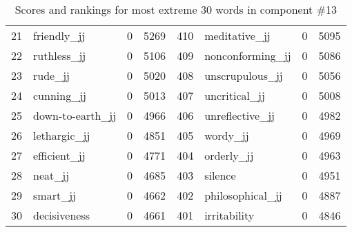 \begin{table}[tbp]
\begin{tabular}{| rlr@{.}l | rlr@{.}l |}
    21 & friendly\_jj & 0 & 5269    &    410 & meditative\_jj & 0 & 5095 \\
    22 & ruthless\_jj & 0 & 5106    &    409 & nonconforming\_jj & 0 & 5086 \\
    23 & rude\_jj & 0 & 5020    &    408 & unscrupulous\_jj & 0 & 5056 \\
    24 & cunning\_jj & 0 & 5013    &    407 & uncritical\_jj & 0 & 5008 \\
    25 & down-to-earth\_jj & 0 & 4966    &    406 & unreflective\_jj & 0 & 4982 \\
    26 & lethargic\_jj & 0 & 4851    &    405 & wordy\_jj & 0 & 4969 \\
    27 & efficient\_jj & 0 & 4771    &    404 & orderly\_jj & 0 & 4963 \\
    28 & neat\_jj & 0 & 4685    &    403 & silence & 0 & 4951 \\
    29 & smart\_jj & 0 & 4662    &    402 & philosophical\_jj & 0 & 4887 \\
    30 & decisiveness & 0 & 4661    &    401 & irritability & 0 & 4846 \\
    \hline
    \end{tabular}
    \caption{Scores and rankings for most extreme 30 words in component \#13} 
\end{table}
\clearpage
